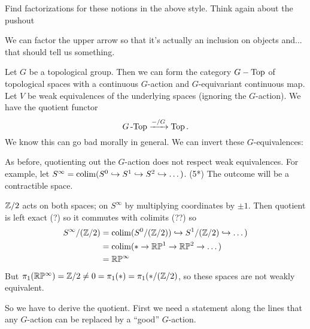 \documentclass[class=report, crop=false,a4paper,twoside]{standalone}
\begin{document}
\begin{exercise}
	Find factorizations for these notions in the above style. Think again about the pushout 
		\begin{center}
	\end{center}
	We can factor the upper arrow so that it's actually an inclusion on objects and... that should tell us something.
\end{exercise}

\begin{example}
	Let $G$ be a topological group. Then we can form the category $G-\operatorname{Top}$ of topological spaces with a continuous $G$-action and $G$-equivariant continuous map. Let $V$ be weak equivalences of the underlying spaces (ignoring the $G$-action). We have the quotient functor
	\[
	G\operatorname{-Top} \xrightarrow{-/G} \operatorname{Top}.
	\]
	We know this can go bad morally in general. We can invert these $G$-equivalences:
	\begin{center}
	\end{center}
	As before, quotienting out the $G$-action does not respect weak equivalences. For example, let $S^\infty = \operatorname{colim}(S^0 \hookrightarrow S^1 \hookrightarrow S^2 \hookrightarrow \dots)$. (5*) The outcome will be a contractible space.

	$\mathbb{Z}/2$ acts on both spaces; on $S^\infty$ by multiplying coordinates by $\pm 1$. Then quotient is left exact (?) so it commutes with colimits (??) so
	\begin{align*}
	S^\infty/(\mathbb{Z}/2) &= \operatorname{colim}(S^0/(\mathbb{Z}/2)) \hookrightarrow S^1/(\mathbb{Z}/2) \hookrightarrow \dots)\\
	&= \operatorname{colim}(* \to \mathbb{R}\mathbb{P}^1 \to \mathbb{R}\mathbb{P}^2 \to \dots)\\
	&= \mathbb{R}\mathbb{P}^\infty
	\end{align*}
	But $\pi_1(\mathbb{R}\mathbb{P}^\infty) = \mathbb{Z}/2 \ne 0 = \pi_1(*) = \pi_1(*/(\mathbb{Z}/2)$, so these spaces are not weakly equivalent.

	So we have to derive the quotient. First we need a statement along the lines that any $G$-action can be replaced by a ``good'' $G$-action.


\end{example}
\end{document}
